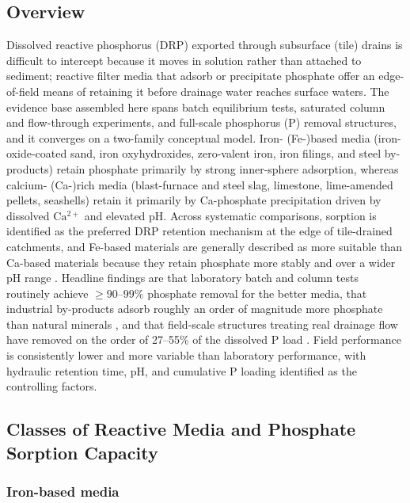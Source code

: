 \subsection{Overview}

Dissolved reactive phosphorus (DRP) exported through subsurface (tile) drains
is difficult to intercept because it moves in solution rather than attached to
sediment; reactive filter media that adsorb or precipitate phosphate offer an
edge-of-field means of retaining it before drainage water reaches surface waters.
The evidence base assembled here spans batch equilibrium tests, saturated column
and flow-through experiments, and full-scale phosphorus (P) removal structures,
and it converges on a two-family conceptual model. Iron- (Fe-)based media
(iron-oxide-coated sand, iron oxyhydroxides, zero-valent iron, iron filings,
and steel by-products) retain phosphate primarily by strong inner-sphere
adsorption, whereas calcium- (Ca-)rich media (blast-furnace and steel slag,
limestone, lime-amended pellets, seashells) retain it primarily by
Ca-phosphate precipitation driven by dissolved $\mathrm{Ca^{2+}}$ and elevated pH.
Across systematic comparisons, sorption is identified as the preferred DRP
retention mechanism at the edge of tile-drained catchments, and Fe-based
materials are generally described as more suitable than Ca-based materials
because they retain phosphate more stably and over a wider pH range
\parencite{Mendes2022,Li2020}. Headline findings are that laboratory batch and
column tests routinely achieve $\geq 90$--$99\%$ phosphate removal for the better
media, that industrial by-products adsorb roughly an order of magnitude more
phosphate than natural minerals \parencite{Sellner2019b}, and that field-scale
structures treating real drainage flow have removed on the order of
27--55\% of the dissolved P load \parencite{Penn2020,Penn2024,Shedekar2020}.
Field performance is consistently lower and more variable than laboratory
performance, with hydraulic retention time, pH, and cumulative P loading
identified as the controlling factors.

\subsection{Classes of Reactive Media and Phosphate Sorption Capacity}

\subsubsection{Iron-based media}

